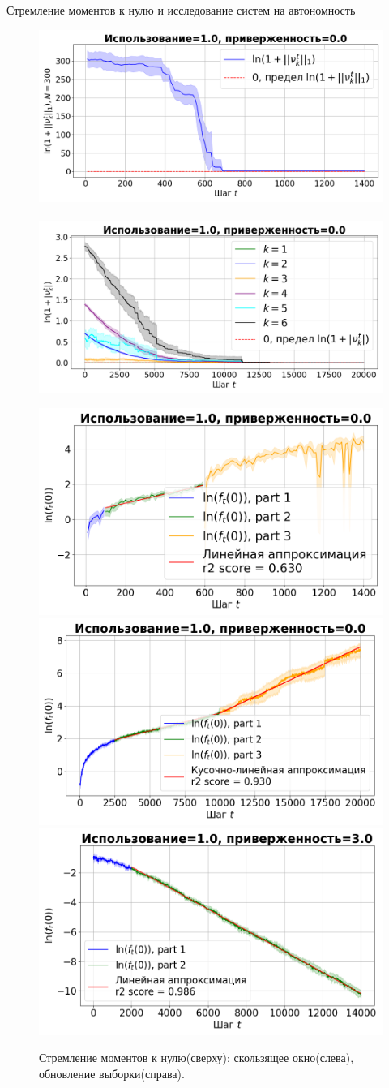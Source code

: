 \documentclass[aspectratio=169]{beamer}
\begin{document}
    \begin{frame}{Стремление моментов к нулю и исследование систем на автономность}
    \footnotesize
    \vspace{-2mm}
        \begin{figure}
            \centering
            \includegraphics[width=0.49\linewidth]{fig/k_mom_sw_synthetic_sgd_model_50_1.0_0.0.png}~
            \includegraphics[width=0.49\linewidth]{fig/k_mom_su_synthetic_sgd_model_50_1.0_0.0.png}
            
            \includegraphics[width=0.326\linewidth]{fig/aut_sw_synthetic_sgd_model_50_1.0_0.0.png}
            \includegraphics[width=0.326\linewidth]{fig/aut_su_synthetic_sgd_model_50_1.0_0.0.png}
            \includegraphics[width=0.326\linewidth]{fig/aut_su_synthetic_sgd_model_50_1.0_3.0.png}
            \vspace{-2mm}
            \caption{Стремление моментов к нулю(сверху): скользящее окно(слева), обновление выборки(справа).
            }
        \end{figure}
    \end{frame}
\end{document}
